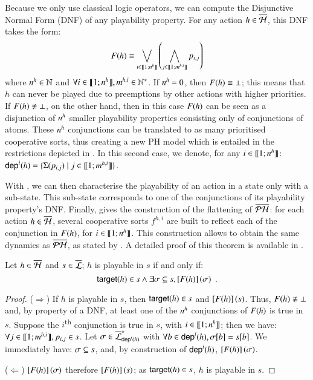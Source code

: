 Because we only use classical logic operators, we can compute the Disjunctive Normal Form (DNF) of any playability property.
For any action $h \in \overline{\mathcal{H}}$, this DNF takes the form:
\[F(h) \equiv \bigvee_{i \in \llbracket 1; n^{h} \rrbracket} \left( \bigwedge_{j \in \llbracket 1; m^{h,i} \rrbracket} p_{i,j} \right)\]
where $n^{h} \in \mathbb{N}$ and $\forall i \in \llbracket 1; n^{h} \rrbracket, m^{h,i} \in \mathbb{N}^*$.
If $n^{h} = 0$, then $F(h) \equiv \bot$; this means that $h$ can never be played
due to preemptions by other actions with higher priorities.
If $F(h) \not\equiv \bot$, on the other hand, then in this case $F(h)$
can be seen as a disjunction of $n^{h}$ smaller playability properties consisting only of conjunctions of atoms.
These $n^{h}$ conjunctions can be translated to as many prioritised cooperative sorts,
thus creating a new PH model which is entailed in the restrictions depicted in .
In this second case, we denote, for any $i \in \llbracket 1; n^{h} \rrbracket$:
$\mathsf{dep}^{i}(h) = \{ \Sigma(p_{i,j}) \mid j \in \llbracket 1; m^{h,i} \rrbracket \}$.

With , we can then characterise the playability of an action in a state only with a sub-state.
This sub-state corresponds to one of the conjunctions of its playability property's DNF.
Finally,  gives the construction of the flattening of $\overline{\mathcal{PH}}$:
for each action $h \in \overline{\mathcal{H}}$, several cooperative sorts $f^{h,i}$ are built to reflect each of the conjunction in $F(h)$,
\ie for $i \in \llbracket 1; n^{h} \rrbracket$.
This construction allows to obtain the same dynamics as $\overline{\mathcal{PH}}$, as stated by .
A detailed proof of this theorem is available in .
%
\begin{lemma}
\label{lem:ppplaysubset}
  Let $h \in \overline{\mathcal{H}}$ and $s \in \overline{\mathcal{L}}$;
  $h$ is playable in $s$ if and only if:
  \[\mathsf{target}(h) \in s \wedge \exists \sigma \subseteq s, \left[F(h)\right](\sigma) \enspace.\]
\end{lemma}
%
\begin{proof}
  ($\Rightarrow$)
    If $h$ is playable in $s$, then $\mathsf{target}(h) \in s$ and $\left[F(h)\right](s)$.
    Thus, $F(h) \not\equiv \bot$ and, by property of a DNF,
    at least one of the $n^{h}$ conjunctions of $F(h)$ is true in $s$.
    Suppose the $i$\textsuperscript{th} conjunction is true in $s$, with $i \in \llbracket 1; n^{h} \rrbracket$;
    then we have: $\forall j \in \llbracket 1; m^{h,i} \rrbracket, p_{i,j} \in s$.
    Let $\sigma \in \overline{\mathcal{L}}^\diamond_{\mathsf{dep}^{i}(h)}$
    with $\forall b \in \mathsf{dep}^{i}(h), {\sigma[b]} = {s[b]}$.
    We immediately have: $\sigma \subseteq s$,
    and, by construction of $\mathsf{dep}^{i}(h)$, $\left[F(h)\right](\sigma)$.
  
  ($\Leftarrow$)
    $\left[F(h)\right](\sigma)$ therefore $\left[F(h)\right](s)$; as $\mathsf{target}(h) \in s$, $h$ is playable in $s$.
\end{proof}

